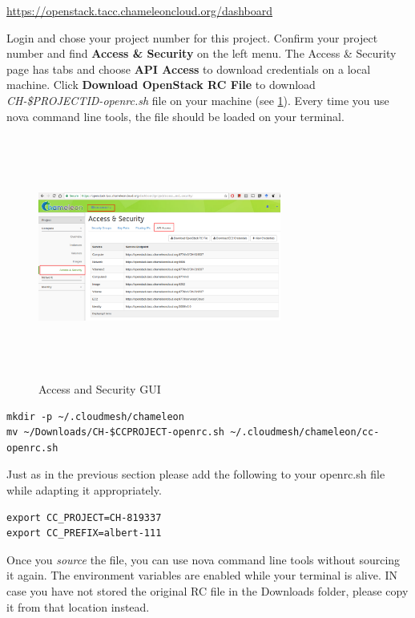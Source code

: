 \url{https://openstack.tacc.chameleoncloud.org/dashboard}

Login and chose your project number for this project.  Confirm your
project number and find \textbf{Access \& Security} on the left menu.
The Access \& Security page has tabs and choose \textbf{API Access} to
download credentials on a local machine. Click \textbf{Download
  OpenStack RC File} to download \textit{CH-\$PROJECTID-openrc.sh}
file on your machine (see \ref{F:cc-gui}). Every time you use nova
command line tools, the file should be loaded on your terminal.


\begin{figure}[!htbp]
  \centering 
  \includegraphics[width=8cm,height=8cm]{section/cloud/chameleon/images/openstack-chameleon-openrc.png}
  \caption{Access and Security GUI}
  \label{F:cc-gui}
\end{figure}


\begin{lstlisting}
mkdir -p ~/.cloudmesh/chameleon
mv ~/Downloads/CH-$CCPROJECT-openrc.sh ~/.cloudmesh/chameleon/cc-openrc.sh
\end{lstlisting}

Just as in the previous section please add the following to your
openrc.sh file while adapting it appropriately.

\begin{lstlisting}
export CC_PROJECT=CH-819337
export CC_PREFIX=albert-111
\end{lstlisting}

Once you \textit{source} the file, you can use nova command line tools
without sourcing it again.  The environment variables are enabled
while your terminal is alive. IN case you have not stored the original
RC file in the Downloads folder, please copy it from that location
instead.


